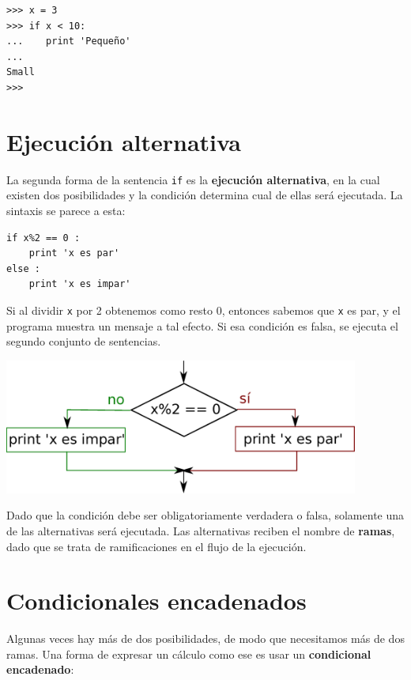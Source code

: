 \beforeverb
\begin{verbatim}
>>> x = 3
>>> if x < 10:
...    print 'Pequeño'
... 
Small
>>>
\end{verbatim}
\afterverb
%

\section{Ejecución alternativa}
\label{alternative execution}


La segunda forma de la sentencia {\tt if} es la {\bf ejecución alternativa},
en la cual existen dos posibilidades y la condición determina
cual de ellas será ejecutada. La sintaxis se parece a esta:

\beforeverb
\begin{verbatim}
if x%2 == 0 :
    print 'x es par'
else :
    print 'x es impar'
\end{verbatim}
\afterverb
%
Si al dividir {\tt x} por 2 obtenemos como resto 0, entonces sabemos
que {\tt x} es par, y el programa muestra un mensaje a tal
efecto. Si esa condición es falsa, se ejecuta el segundo
conjunto de sentencias.

\beforefig
\centerline{\includegraphics[height=1.75in]{figs2/if-else.eps}}
\afterfig

Dado que la condición debe ser obligatoriamente verdadera o falsa, solamente una de
las alternativas será ejecutada. Las alternativas reciben el nombre de
{\bf ramas}, dado que se trata de ramificaciones en el flujo de la ejecución.


\section{Condicionales encadenados}

Algunas veces hay más de dos posibilidades, de modo que necesitamos más
de dos ramas. Una forma de expresar un cálculo como ese es usar un
{\bf condicional encadenado}:

